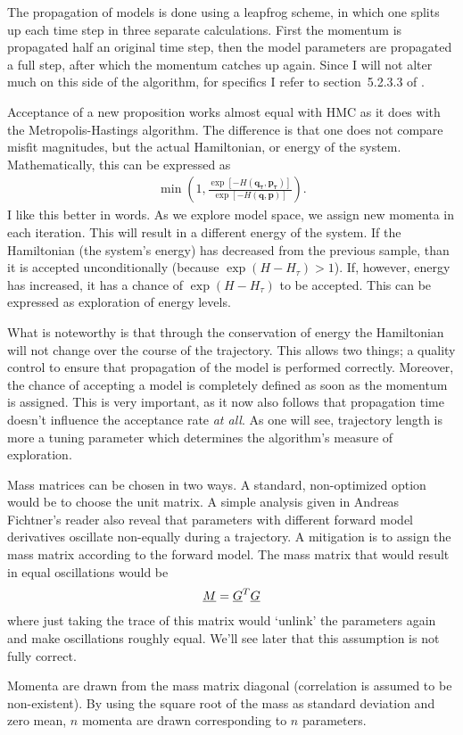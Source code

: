 The propagation of models is done using a leapfrog scheme, in which one splits up each time step in three separate calculations. First the momentum is propagated half an original time step, then the model parameters are propagated a full step, after which the momentum catches up again. Since I will not alter much on this side of the algorithm, for specifics I refer to section~5.2.3.3 of \cite{neal2011mcmc}.

Acceptance of a new proposition works almost equal with \gls{HMC} as it does with the Metropolis-Hastings algorithm. The difference is that one does not compare misfit magnitudes, but the actual Hamiltonian, or energy of the system. Mathematically, this can be expressed as
\begin{gather}
	\min\left( 1, \frac{\exp\left[-H(\mathbf{q_\tau},\mathbf{p_\tau}) \right]}{\exp\left[-H(\mathbf{q},\mathbf{p}) \right]} \right).
\end{gather}
I like this better in words. As we explore model space, we assign new momenta in each iteration. This will result in a different energy of the system. If the Hamiltonian (the system's energy) has decreased from the previous sample, than it is accepted unconditionally (because $\exp (H - H_\tau)>1$). If, however, energy has increased, it has a chance of $\exp \left(H - H_\tau\right)$ to be accepted. This can be expressed as exploration of energy levels.

What is noteworthy is that through the conservation of energy the Hamiltonian will not change over the course of the trajectory. This allows two things; a quality control to ensure that propagation of the model is performed correctly. Moreover, the chance of accepting a model is completely defined as soon as the momentum is assigned. This is very important, as it now also follows that propagation time doesn't influence the acceptance rate \textit{at all}. As one will see, trajectory length is more a tuning parameter which determines the algorithm's measure of exploration.

Mass matrices can be chosen in two ways. A standard, non-optimized option would be to choose the unit matrix. A simple analysis given in Andreas Fichtner's reader also reveal that parameters with different forward model derivatives oscillate non-equally during a trajectory. A mitigation is to assign the mass matrix according to the forward model. The mass matrix that would result in equal oscillations would be 
\begin{gather}\label{eq:massMatrixForward}
\underline{M} = \underline{G}^T \underline{G}
\end{gather}
where just taking the trace of this matrix would `unlink' the parameters again and make oscillations roughly equal. We'll see later that this assumption is not fully correct.

 Momenta are drawn from the mass matrix diagonal (correlation is assumed to be non-existent). By using the square root of the mass as standard deviation and zero mean, $n$ momenta are drawn corresponding to $n$ parameters.

